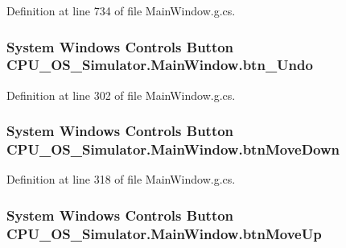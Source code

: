 Definition at line 734 of file Main\+Window.\+g.\+cs.

\hypertarget{class_c_p_u___o_s___simulator_1_1_main_window_ac30720a1b345a3d59312d2d68f742359}{}
\subsubsection[{btn\+\_\+\+Undo}]{\setlength{\rightskip}{0pt plus 5cm}System Windows Controls Button C\+P\+U\+\_\+\+O\+S\+\_\+\+Simulator.\+Main\+Window.\+btn\+\_\+\+Undo\hspace{0.3cm}{\ttfamily [package]}}\label{class_c_p_u___o_s___simulator_1_1_main_window_ac30720a1b345a3d59312d2d68f742359}


Definition at line 302 of file Main\+Window.\+g.\+cs.

\hypertarget{class_c_p_u___o_s___simulator_1_1_main_window_ac6bfabebf21c92a905764305b789df46}{}
\subsubsection[{btn\+Move\+Down}]{\setlength{\rightskip}{0pt plus 5cm}System Windows Controls Button C\+P\+U\+\_\+\+O\+S\+\_\+\+Simulator.\+Main\+Window.\+btn\+Move\+Down\hspace{0.3cm}{\ttfamily [package]}}\label{class_c_p_u___o_s___simulator_1_1_main_window_ac6bfabebf21c92a905764305b789df46}


Definition at line 318 of file Main\+Window.\+g.\+cs.

\hypertarget{class_c_p_u___o_s___simulator_1_1_main_window_aa85d9301fed773f44a352aad64a9d80d}{}
\subsubsection[{btn\+Move\+Up}]{\setlength{\rightskip}{0pt plus 5cm}System Windows Controls Button C\+P\+U\+\_\+\+O\+S\+\_\+\+Simulator.\+Main\+Window.\+btn\+Move\+Up\hspace{0.3cm}{\ttfamily [package]}}\label{class_c_p_u___o_s___simulator_1_1_main_window_aa85d9301fed773f44a352aad64a9d80d}



